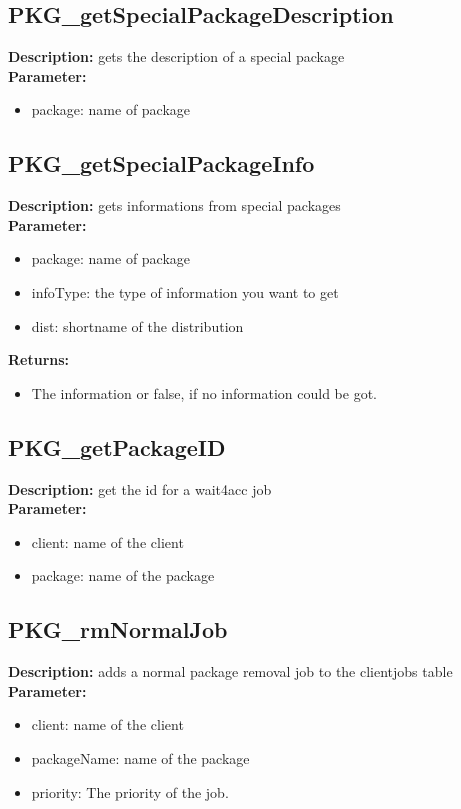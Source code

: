 \subsection{PKG\_getSpecialPackageDescription}
\textbf{Description:} gets the description of a special package\\
\textbf{Parameter:}
\begin{itemize}
\item package: name of package
\end{itemize}

\subsection{PKG\_getSpecialPackageInfo}
\textbf{Description:} gets informations from special packages\\
\textbf{Parameter:}
\begin{itemize}
\item package: name of package
\item infoType: the type of information you want to get
\item dist: shortname of the distribution
\end{itemize}
\textbf{Returns:}
\begin{itemize}
\item The information or false, if no information could be got.
\end{itemize}

\subsection{PKG\_getPackageID}
\textbf{Description:} get the id for a wait4acc job\\
\textbf{Parameter:}
\begin{itemize}
\item client: name of the client
\item package: name of the package
\end{itemize}

\subsection{PKG\_rmNormalJob}
\textbf{Description:} adds a normal package removal job to the clientjobs table\\
\textbf{Parameter:}
\begin{itemize}
\item client: name of the client
\item packageName: name of the package
\item priority: The priority of the job.
\end{itemize}


